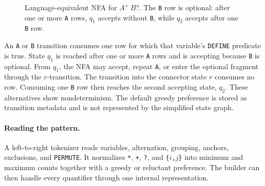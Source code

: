\begin{figure}[htbp]
  \caption[Language-equivalent NFA for $A^{+}\,B?$]{Language-equivalent
    NFA for $A^{+}\,B?$.  The \texttt{B} row is optional: after one or
    more \texttt{A} rows, $q_1$ accepts without \texttt{B}, while $q_2$
    accepts after one \texttt{B} row.}
  \label{fig:meth-nfa}
\end{figure}

An \texttt{A} or \texttt{B} transition consumes one row for which that
variable's \texttt{DEFINE} predicate is true.  State $q_1$ is reached
after one or more \texttt{A} rows and is accepting because \texttt{B}
is optional.  From $q_1$, the NFA may accept, repeat \texttt{A}, or
enter the optional fragment through the $\varepsilon$-transition.  The
transition into the connector state $r$ consumes no row.  Consuming one
\texttt{B} row then reaches the second accepting state, $q_2$.  These
alternatives show nondeterminism.  The default greedy preference is
stored as transition metadata and is not represented by the simplified
state graph.

\paragraph{Reading the pattern.}
A left-to-right tokenizer reads variables, alternation, grouping,
anchors, exclusions, and \texttt{PERMUTE}.  It normalizes
\texttt{*}, \texttt{+}, \texttt{?}, and
\texttt{\{$i$,$j$\}} into minimum and maximum counts together with a
greedy or reluctant preference.  The builder can then handle every
quantifier through one internal representation.

